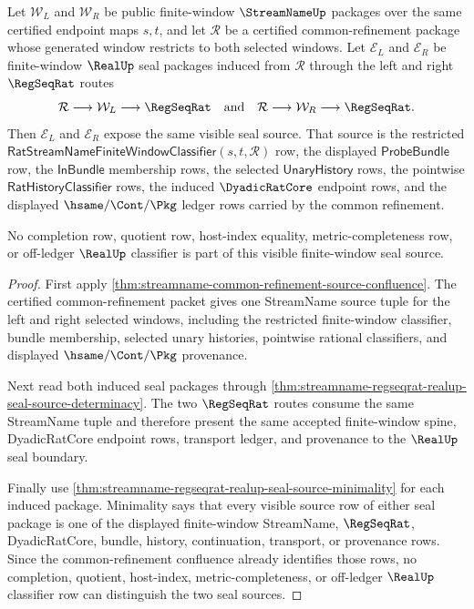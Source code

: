 \begin{theorem}
\label{thm:streamname-common-refinement-real-seal-confluence}
Let $\mathcal W_L$ and $\mathcal W_R$ be public finite-window
$\StreamNameUp$ packages over the same certified endpoint maps $s,t$, and let
$\mathcal R$ be a certified common-refinement package whose generated window
restricts to both selected windows. Let $\mathcal E_L$ and $\mathcal E_R$ be
finite-window $\RealUp$ seal packages induced from $\mathcal R$ through the
left and right $\RegSeqRat$ routes
$$
\mathcal R\longrightarrow \mathcal W_L\longrightarrow \RegSeqRat
\quad\text{and}\quad
\mathcal R\longrightarrow \mathcal W_R\longrightarrow \RegSeqRat.
$$
Then $\mathcal E_L$ and $\mathcal E_R$ expose the same visible seal source.
That source is the restricted
$\mathsf{RatStreamNameFiniteWindowClassifier}(s,t,\mathcal R)$ row, the
displayed $\mathsf{ProbeBundle}$ row, the $\mathsf{InBundle}$ membership rows,
the selected $\mathsf{UnaryHistory}$ rows, the pointwise
$\mathsf{RatHistoryClassifier}$ rows, the induced $\DyadicRatCore$ endpoint
rows, and the displayed $\hsame/\Cont/\Pkg$ ledger rows carried by the common
refinement.

No completion row, quotient row, host-index equality, metric-completeness row,
or off-ledger $\RealUp$ classifier is part of this visible finite-window seal
source.
\end{theorem}
\begin{proof}
First apply
\autoref{thm:streamname-common-refinement-source-confluence}. The certified
common-refinement packet gives one StreamName source tuple for the left and
right selected windows, including the restricted finite-window classifier,
bundle membership, selected unary histories, pointwise rational classifiers,
and displayed $\hsame/\Cont/\Pkg$ provenance.

Next read both induced seal packages through
\autoref{thm:streamname-regseqrat-realup-seal-source-determinacy}. The two
$\RegSeqRat$ routes consume the same StreamName tuple and therefore present the
same accepted finite-window spine, DyadicRatCore endpoint rows, transport
ledger, and provenance to the $\RealUp$ seal boundary.

Finally use
\autoref{thm:streamname-regseqrat-realup-seal-source-minimality} for each
induced package. Minimality says that every visible source row of either seal
package is one of the displayed finite-window StreamName, $\RegSeqRat$,
DyadicRatCore, bundle, history, continuation, transport, or provenance rows.
Since the common-refinement confluence already identifies those rows, no
completion, quotient, host-index, metric-completeness, or off-ledger
$\RealUp$ classifier row can distinguish the two seal sources.
\end{proof}

